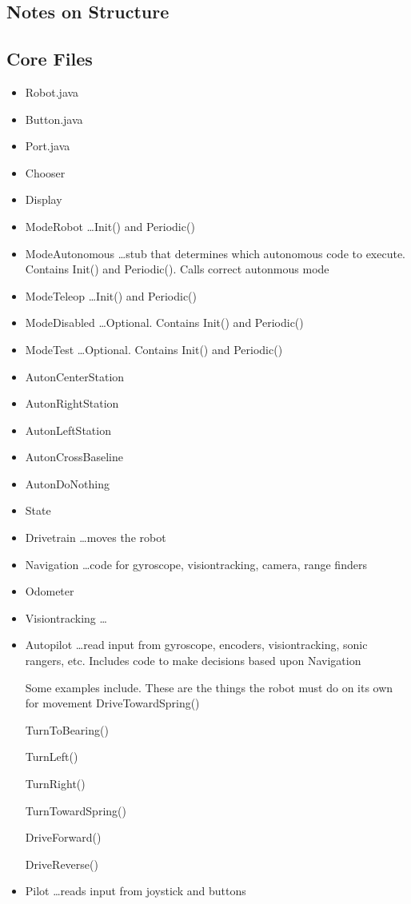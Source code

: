 \documentclass[letterpaper,10pt]{memoir}
\begin{document}
% 

\newpage
\subsection*{Notes on Structure}

\subsection*{Core Files}
\begin{itemize}
\item Robot.java

\item Button.java
\item Port.java

\item Chooser
\item Display

\item ModeRobot \ldots Init() and Periodic()
\item ModeAutonomous \ldots stub that determines which autonomous code to execute. Contains Init() and Periodic(). Calls correct autonmous mode
\item ModeTeleop \ldots Init() and Periodic()
\item ModeDisabled \ldots Optional. Contains Init() and Periodic()
\item ModeTest \ldots Optional. Contains Init() and Periodic()

\item AutonCenterStation
\item AutonRightStation
\item AutonLeftStation
\item AutonCrossBaseline
\item AutonDoNothing
\item State

\item Drivetrain \ldots moves the robot
\item Navigation \ldots code for gyroscope, visiontracking, camera, range finders
\item Odometer
\item Visiontracking \ldots

\item Autopilot \ldots read input from gyroscope, encoders, visiontracking, sonic rangers, etc. Includes code to make decisions based upon Navigation

Some examples include. These are the things the robot must do on its own for movement
 DriveTowardSpring()

 TurnToBearing()
 
 TurnLeft()
 
 TurnRight()
  
 TurnTowardSpring()

 DriveForward()
 
 DriveReverse()

\item Pilot \ldots reads input from joystick and buttons


\end{itemize}
\end{document}
